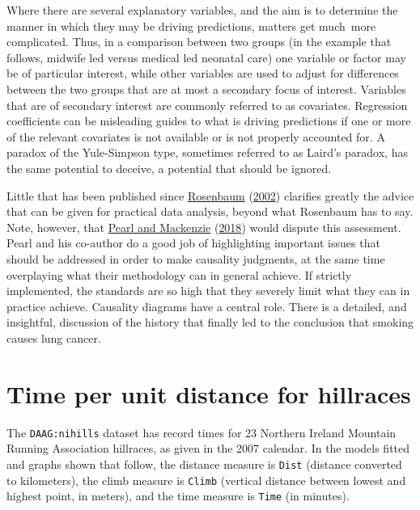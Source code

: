 \documentclass[
  10pt,
  b5paper]{book}
\begin{document}
Where there are several explanatory variables, and the aim is
to determine the manner in which they may be driving predictions,
matters get much~more complicated. Thus, in a comparison
between two groups (in the example that follows, midwife led
versus medical led neonatal care) one variable or factor may
be of particular interest, while other variables are used to
adjust for differences between the two groups that are at
most a secondary focus of interest. Variables that are of
secondary interest are commonly referred to as covariates.
Regression coefficients can be misleading guides to what is
driving predictions if one or more of the relevant covariates
is not available or is not properly accounted for. A paradox
of the Yule-Simpson type, sometimes referred to as Laird's
paradox, has the same potential to deceive, a potential that
should be ignored.

Little that has been published since \protect\hyperlink{ref-RosBook}{Rosenbaum} (\protect\hyperlink{ref-RosBook}{2002}) clarifies greatly the
advice that can be given for practical data analysis, beyond what
Rosenbaum has to say. Note, however, that \protect\hyperlink{ref-pearl2018book}{Pearl and Mackenzie} (\protect\hyperlink{ref-pearl2018book}{2018}) would
dispute this assessment. Pearl and his co-author do a good job of
highlighting important issues that should be addressed in order to
make causality judgments, at the same time overplaying what their
methodology can in general achieve. If strictly implemented,
the standards are so high that they severely limit what they can
in practice achieve. Causality diagrams have a central role.
There is a detailed, and insightful, discussion of the history
that finally led to the conclusion that smoking causes lung cancer.

\hypertarget{time-per-unit-distance-for-hillraces}{%
\section{Time per unit distance for hillraces}\label{time-per-unit-distance-for-hillraces}}

The \texttt{DAAG:nihills} dataset has record times for 23 Northern Ireland
Mountain Running Association hillraces, as given in the 2007
calendar. In the models fitted and graphs shown that follow,
the distance measure is \texttt{Dist} (distance converted to kilometers),
the climb measure is \texttt{Climb} (vertical distance between lowest
and highest point, in meters), and the time measure is \texttt{Time}
(in minutes).
\end{document}
